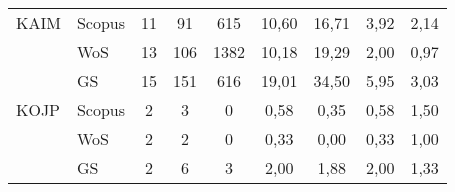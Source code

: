\begin{table}
\begin{tabular}{llccccccc}
 KAIM & Scopus & 11 & 91   & 615   & 10,60         & 16,71 & 3,92  & 2,14 \\
      & WoS    & 13 & 106  & 1382  & 10,18         & 19,29 & 2,00  & 0,97 \\
      & GS     & 15 & 151  & 616   & 19,01         & 34,50 & 5,95  & 3,03 \\[1ex]
 KOJP & Scopus & 2  & 3    & 0     & 0,58          & 0,35  & 0,58  & 1,50 \\
      & WoS    & 2  & 2    & 0     & 0,33          & 0,00  & 0,33  & 1,00 \\
      & GS     & 2  & 6    & 3     & 2,00          & 1,88  & 2,00  & 1,33 \\
  \bottomrule
\end{tabular}
\end{table}

